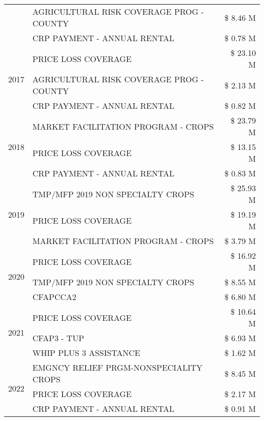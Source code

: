 \begin{tabular}{llr}
 & AGRICULTURAL RISK COVERAGE PROG - COUNTY & \$ 8.46 M \\
 & CRP PAYMENT - ANNUAL RENTAL & \$ 0.78 M \\
\cline{1-3}
\multirow[t]{3}{*}{2017} & PRICE LOSS COVERAGE & \$ 23.10 M \\
 & AGRICULTURAL RISK COVERAGE PROG - COUNTY & \$ 2.13 M \\
 & CRP PAYMENT - ANNUAL RENTAL & \$ 0.82 M \\
\cline{1-3}
\multirow[t]{3}{*}{2018} & MARKET FACILITATION PROGRAM - CROPS & \$ 23.79 M \\
 & PRICE LOSS COVERAGE & \$ 13.15 M \\
 & CRP PAYMENT - ANNUAL RENTAL & \$ 0.83 M \\
\cline{1-3}
\multirow[t]{3}{*}{2019} & TMP/MFP 2019 NON SPECIALTY CROPS & \$ 25.93 M \\
 & PRICE LOSS COVERAGE & \$ 19.19 M \\
 & MARKET FACILITATION PROGRAM - CROPS & \$ 3.79 M \\
\cline{1-3}
\multirow[t]{3}{*}{2020} & PRICE LOSS COVERAGE & \$ 16.92 M \\
 & TMP/MFP 2019 NON SPECIALTY CROPS & \$ 8.55 M \\
 & CFAPCCA2 & \$ 6.80 M \\
\cline{1-3}
\multirow[t]{3}{*}{2021} & PRICE LOSS COVERAGE & \$ 10.64 M \\
 & CFAP3 - TUP & \$ 6.93 M \\
 & WHIP PLUS 3 ASSISTANCE & \$ 1.62 M \\
\cline{1-3}
\multirow[t]{3}{*}{2022} & EMGNCY RELIEF PRGM-NONSPECIALITY CROPS & \$ 8.45 M \\
 & PRICE LOSS COVERAGE & \$ 2.17 M \\
 & CRP PAYMENT - ANNUAL RENTAL & \$ 0.91 M \\
\cline{1-3}
\bottomrule
\end{tabular}

